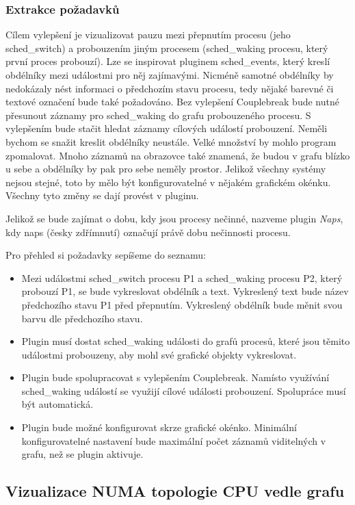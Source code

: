 \subsubsection*{Extrakce požadavků}
Cílem vylepšení je vizualizovat pauzu mezi přepnutím procesu (jeho sched\_switch) a probouzením jiným procesem (sched\_waking procesu, který první proces probouzí). Lze se inspirovat pluginem sched\_events, který kreslí obdélníky mezi událostmi pro něj zajímavými. Nicméně samotné obdélníky by nedokázaly nést informaci o předchozím stavu procesu, tedy nějaké barevné či textové označení bude také požadováno. Bez vylepšení Couplebreak bude nutné přesunout záznamy pro sched\_waking do grafu probouzeného procesu. S vylepšením bude stačit hledat záznamy cílových událostí probouzení. Neměli bychom se snažit kreslit obdélníky neustále. Velké množství by mohlo program zpomalovat. Mnoho záznamů na obrazovce také znamená, že budou v grafu blízko u sebe a obdělníky by pak pro sebe neměly prostor. Jelikož všechny systémy nejsou stejné, toto by mělo být konfigurovatelné v nějakém grafickém okénku. Všechny tyto změny se dají provést v pluginu.

Jelikož se bude zajímat o dobu, kdy jsou procesy nečinné, nazveme plugin \emph{Naps}, kdy naps (česky zdřímnutí) označují právě dobu nečinnosti procesu.

Pro přehled si požadavky sepíšeme do seznamu:
\begin{itemize}
    \item Mezi událostmi sched\_switch procesu P1 a sched\_waking procesu P2, který probouzí P1, se bude vykreslovat obdélník a text. Vykreslený text bude název předchozího stavu P1 před přepnutím. Vykreslený obdélník bude měnit svou barvu dle předchozího stavu.
    \item Plugin musí dostat sched\_waking události do grafů procesů, které jsou těmito událostmi probouzeny, aby mohl své grafické objekty vykreslovat.
    \item Plugin bude spolupracovat s vylepšením Couplebreak. Namísto využívání sched\_waking událostí se využijí cílové události probouzení. Spolupráce musí být automatická.
    \item Plugin bude možné konfigurovat skrze grafické okénko. Minimální konfigurovatelné nastavení bude maximální počet záznamů viditelných v grafu, než se plugin aktivuje. 
\end{itemize}

\subsection{Vizualizace NUMA topologie CPU vedle grafu}

